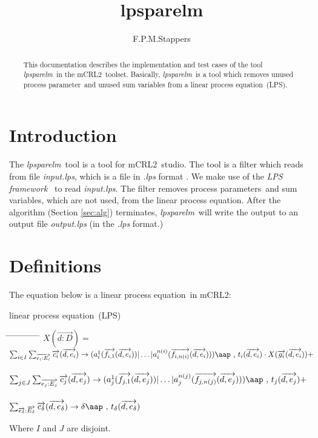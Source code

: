 \documentclass[a4paper,10pt]{article}
\title{lpsparelm}
\author{F.P.M.Stappers}
\theoremstyle{plain}
\theoremstyle{definition}
\newcommand{\mcrl}{mCRL2}
\newcommand{\lps}{linear process equation}
\newcommand{\tool}{\textit{lpsparelm}}
\newcommand{\ti}{\textit}
\newcommand{\ovr}{\overrightarrow}
\newcommand{\pp}{process parameter}
\newcommand{\pps}{process parameters}
\newcommand{\framework}{\textit{LPS framework} \cite{LPSframework}}
\newcommand{\tab}{\hspace*{5.mm} \= \hspace*{5.mm} \= \hspace*{5.mm} \= \hspace*{5.mm} \= \hspace*{5.mm} \= \hspace*{5.mm}  \= \hspace*{5.mm}  \= \hspace*{5.mm}  \= \hspace*{5.mm} \= \hspace*{5.mm} \= \hspace*{5.mm}  \= \hspace*{5.mm}  \= \hspace*{5.mm}\kill}
\newcommand{\at}[1]{\mbox{\aap ,} #1}
\begin{document}
\maketitle

\begin{abstract}
This documentation describes the implementation and test cases of the tool \tool\ in  the \mcrl\ toolset.
Basically, \tool\ is a tool which removes unused \pp\ and unused sum variables from a \lps\ (LPS).
\end{abstract}

\tableofcontents

\section{Introduction}
The \tool\ tool is a tool for \mcrl\ studio. The tool is a
filter which reads from file \ti{input.lps}, which is
a file in \ti{.lps} format \cite{LPSformat}. We make use of the
\framework\ to read \ti{input.lps}. The filter removes \pps\ and sum variables, which are not used, from the
\lps. After the algorithm (Section \ref{sec:alg}) terminates, \tool\
will write the output to an output file \ti{output.lps} (in the \ti{.lps} format.)


\section{Definitions} \label{sec:def}

The equation below is a \lps\ in \mcrl : 
\begin{defn}\lps\ (LPS) \newline
\begin{tabbing}
\tab
$X (\ovr{d: D}) = $ \> \> \> $ \sum_{i \in I} \sum_{\ovr{e_i: E_i}} \ovr{c_i} ( \ovr{d, e_i }) \rightarrow 
(a_i^1 (\ovr{f_{i,1}}(\ovr{d,e_i})) \vert \ldots \vert a_i^{n(i)}(\ovr{f_{i,n(i)}}(\ovr{d,e_i}))) \at \text{ } t_i(\ovr{d,e_i})  \cdot X(\ovr{g_i}(\ovr{d,e_i})) +$ \\ \\
\> \> \> $ \sum_{j \in J} \sum_{\ovr{e_j: E_j}} \ovr{c_j} ( \ovr{d, e_j} ) \rightarrow 
(a_j^1 (\ovr{f_{j,1}}(\ovr{d,e_j})) \vert \ldots \vert a_j^{n(j)}(\ovr{f_{j,n(j)}}(\ovr{d,e_j}))) \at \text{ } t_j(\ovr{d,e_j}) + $ \\ \\
\> \> \> $\sum_{\ovr{e_\delta}:\ovr{E_\delta}} \ovr{c_\delta} ( \ovr{d, e_\delta}) \rightarrow 
\delta \at \text{ } t_\delta(\ovr{d,e_\delta})$ 
\end{tabbing}

Where $I$ and $J$ are disjoint.\\
\end{defn}
\end{document}
